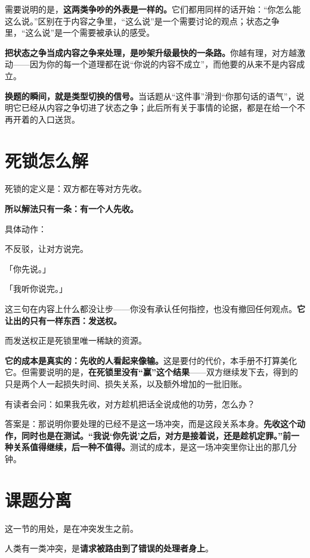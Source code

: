 需要说明的是，\textbf{这两类争吵的外表是一样的。}它们都用同样的话开始：“你怎么能这么说。”区别在于内容之争里，“这么说”是一个需要讨论的观点；状态之争里，“这么说”是一个需要被承认的感受。

\textbf{把状态之争当成内容之争来处理，是吵架升级最快的一条路。}你越有理，对方越激动——因为你的每一个道理都在说“你说的内容不成立”，而他要的从来不是内容成立。

\textbf{换题的瞬间，就是类型切换的信号。}当话题从“这件事”滑到“你那句话的语气”，说明它已经从内容之争切进了状态之争；此后所有关于事情的论据，都是在给一个不再开着的入口送货。

\section{死锁怎么解}

死锁的定义是：双方都在等对方先收。

\textbf{所以解法只有一条：有一个人先收。}

具体动作：

\begin{mdquote}
不反驳，让对方说完。\par
「你先说。」\par
「我听你说完。」
\end{mdquote}

这三句在内容上什么都没让步——你没有承认任何指控，也没有撤回任何观点。\textbf{它让出的只有一样东西：发送权。}

而发送权正是死锁里唯一稀缺的资源。

\textbf{它的成本是真实的：先收的人看起来像输。}这是要付的代价，本手册不打算美化它。但需要说明的是，\textbf{在死锁里没有“赢”这个结果}——双方继续发下去，得到的只是两个人一起损失时间、损失关系，以及额外增加的一批旧账。

有读者会问：如果我先收，对方趁机把话全说成他的功劳，怎么办？

答案是：那说明你要处理的已经不是这一场冲突，而是这段关系本身。\textbf{先收这个动作，同时也是在测试。“我说‘你先说’之后，对方是接着说，还是趁机定罪。”前一种关系值得继续，后一种不值得。}测试的成本，是这一场冲突里你让出的那几分钟。

\section{课题分离}

这一节的用处，是在冲突发生之前。

人类有一类冲突，是\textbf{请求被路由到了错误的处理者身上}。

